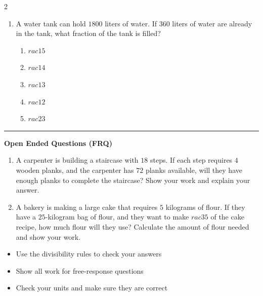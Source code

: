 \documentclass[10pt]{article}
\begin{document}
\begin{multicols}{2}
\begin{enumerate}[label=\textbf{Q\arabic*.}, leftmargin=*, itemsep=6pt, parsep=0pt]
  \item \small A water tank can hold $1800$ liters of water. If $360$ liters of water are already in the tank, what fraction of the tank is filled?
  \begin{enumerate}[label=(\Alph*), leftmargin=0.6cm, nosep, itemsep=2pt]
    \item $rac{1}{5}$
    \item $rac{1}{4}$
    \item $rac{1}{3}$
    \item $rac{1}{2}$
    \item $rac{2}{3}$
  \end{enumerate}

\end{enumerate}
\end{multicols}

\vspace{-0.2cm}
\hrule
\vspace{0.2cm}
\textbf{\small Open Ended Questions (FRQ)}
\begin{enumerate}[label=\textbf{Q\arabic*.}, start=9, itemsep=5pt, topsep=0pt]

  \item \small A carpenter is building a staircase with $18$ steps. If each step requires $4$ wooden planks, and the carpenter has $72$ planks available, will they have enough planks to complete the staircase? Show your work and explain your answer. \vspace{2cm}

  \item \small A bakery is making a large cake that requires $5$ kilograms of flour. If they have a $25$-kilogram bag of flour, and they want to make $rac{3}{5}$ of the cake recipe, how much flour will they use? Calculate the amount of flour needed and show your work. \vspace{2cm}

\end{enumerate}

\vfill

\begin{tcolorbox}[colback=blue!5, colframe=mainblue!50, title=\small \textbf{Chef's Tips}, fonttitle=\bfseries, bottom=1mm]
\begin{itemize}[noitemsep, topsep=2pt, leftmargin=0.5cm]
  \item \scriptsize Use the divisibility rules to check your answers\item \scriptsize Show all work for free-response questions\item \scriptsize Check your units and make sure they are correct
\end{itemize}
\end{tcolorbox}
\end{document}
